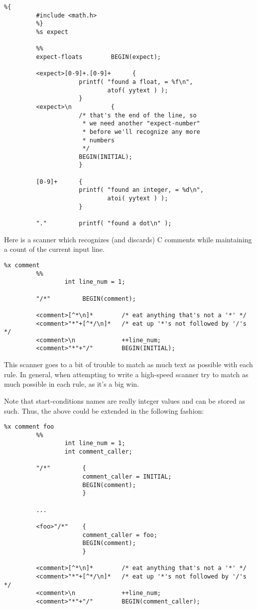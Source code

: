 \documentclass[openany,oneside]{book}
\begin{document}
\begin{verbatim}
%{
         #include <math.h>
         %}
         %s expect
     
         %%
         expect-floats        BEGIN(expect);
     
         <expect>[0-9]+.[0-9]+      {
                     printf( "found a float, = %f\n",
                             atof( yytext ) );
                     }
         <expect>\n           {
                     /* that's the end of the line, so
                      * we need another "expect-number"
                      * before we'll recognize any more
                      * numbers
                      */
                     BEGIN(INITIAL);
                     }
     
         [0-9]+      {
                     printf( "found an integer, = %d\n",
                             atoi( yytext ) );
                     }
     
         "."         printf( "found a dot\n" );
\end{verbatim}


Here is a scanner which recognizes (and discards) C comments while
maintaining a count of the current input line.


\begin{verbatim}
%x comment
         %%
                 int line_num = 1;
     
         "/*"         BEGIN(comment);
     
         <comment>[^*\n]*        /* eat anything that's not a '*' */
         <comment>"*"+[^*/\n]*   /* eat up '*'s not followed by '/'s */
         <comment>\n             ++line_num;
         <comment>"*"+"/"        BEGIN(INITIAL);
\end{verbatim}


This scanner goes to a bit of trouble to match as much
text as possible with each rule.  In general, when attempting to write
a high-speed scanner try to match as much possible in each rule, as
it's a big win.

Note that start-conditions names are really integer values and
can be stored as such.  Thus, the above could be extended in the
following fashion:


\begin{verbatim}
%x comment foo
         %%
                 int line_num = 1;
                 int comment_caller;
     
         "/*"         {
                      comment_caller = INITIAL;
                      BEGIN(comment);
                      }
     
         ...
     
         <foo>"/*"    {
                      comment_caller = foo;
                      BEGIN(comment);
                      }
     
         <comment>[^*\n]*        /* eat anything that's not a '*' */
         <comment>"*"+[^*/\n]*   /* eat up '*'s not followed by '/'s */
         <comment>\n             ++line_num;
         <comment>"*"+"/"        BEGIN(comment_caller);
\end{verbatim}
\end{document}
